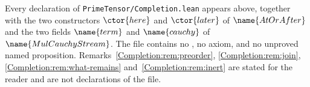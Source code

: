 \noindent
Every declaration of \texttt{PrimeTensor/Completion.lean} appears above,
together with the two constructors $\ctor{here}$ and $\ctor{later}$ of
$\name{AtOrAfter}$ and the two fields $\name{term}$ and $\name{cauchy}$ of
$\name{MulCauchyStream}$.  The file contains no , no axiom, and no
unproved named proposition.  Remarks~\ref{Completion:rem:preorder},
\ref{Completion:rem:join}, \ref{Completion:rem:what-remains}
and~\ref{Completion:rem:inert} are stated for the reader and are not
declarations of the file.
